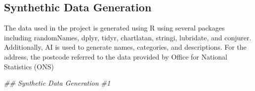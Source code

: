 \documentclass[
  letterpaper,
  DIV=11,
  numbers=noendperiod]{scrartcl}
\newenvironment{Shaded}{\begin{snugshade}}{\end{snugshade}}
\newcommand{\DocumentationTok}[1]{\textcolor[rgb]{0.37,0.37,0.37}{\textit{#1}}}
\begin{document}
\hypertarget{synthethic-data-generation}{%
\subsection{Synthethic Data
Generation}\label{synthethic-data-generation}}

The data used in the project is generated using R using several packages
including randomNames, dplyr, tidyr, chartlatan, stringi, lubridate, and
conjurer. Additionally, AI is used to generate names, categories, and
descriptions. For the address, the postcode referred to the data
provided by Office for National Statistics (ONS)

\begin{Shaded}
\begin{Highlighting}[numbers=left,,]
\DocumentationTok{\#\# Synthetic Data Generation \#1}


\end{Highlighting}
\end{Shaded}
\end{document}

